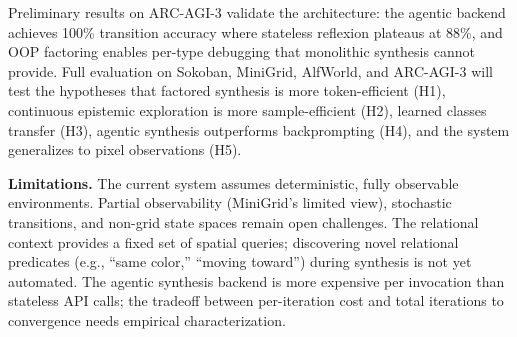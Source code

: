 \documentclass{article}
\begin{document}
Preliminary results on ARC-AGI-3 validate the architecture: the agentic
backend achieves 100\% transition accuracy where stateless reflexion plateaus
at 88\%, and OOP factoring enables per-type debugging that monolithic
synthesis cannot provide.  Full evaluation on Sokoban, MiniGrid, AlfWorld,
and ARC-AGI-3 will test the hypotheses that factored synthesis is more
token-efficient (H1), continuous epistemic exploration is more
sample-efficient (H2), learned classes transfer (H3), agentic synthesis
outperforms backprompting (H4), and the system generalizes to pixel
observations (H5).

\textbf{Limitations.}  The current system assumes deterministic, fully
observable environments.  Partial observability (MiniGrid's limited view),
stochastic transitions, and non-grid state spaces remain open challenges.
The relational context provides a fixed set of spatial queries; discovering
novel relational predicates (e.g., ``same color,'' ``moving toward'') during
synthesis is not yet automated.  The agentic synthesis backend is more
expensive per invocation than stateless API calls; the tradeoff between
per-iteration cost and total iterations to convergence needs empirical
characterization.




\end{document}
